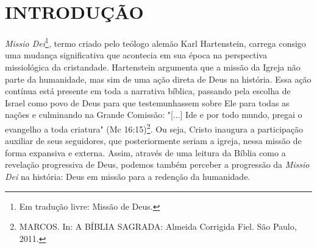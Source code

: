 \documentclass[
    article,            %
	12pt,				%
	oneside,			%
	a4paper,			%
	chapter=TITLE,		%
	section=TITLE,		%
	english,			%
	french,				%
	spanish,			%
	brazil				%
	]{abntex2}
\begin{document}



\imprimircapa

\imprimirfolhaderosto

\tableofcontents*
\cleardoublepage

\textual
\pagestyle{simple}



\section{INTRODUÇÃO}
\emph{Missio Dei}\footnote{Em tradução livre: Missão de Deus.}, termo criado pelo teólogo alemão Karl Hartenstein, carrega consigo uma mudança significativa que acontecia em sua época na perspectiva missiológica da cristandade. Hartenstein argumenta que a missão da Igreja não parte da humanidade, mas sim de uma ação direta de Deus na história. Essa ação contínua está presente em toda a narrativa bíblica, passando pela escolha de Israel como povo de Deus para que testemunhassem sobre Ele para todas as nações e culminando na Grande Comissão: "[...] Ide e por todo mundo, pregai o evangelho a toda criatura" (Mc 16:15)\footnote{MARCOS. In: A BÍBLIA SAGRADA: Almeida Corrigida Fiel. São Paulo, 2011.}. Ou seja, Cristo inaugura a participação auxiliar de seus seguidores, que posteriormente seriam a igreja, nessa missão de forma expansiva e externa. Assim, através de uma leitura da Bíblia como a revelação progressiva de Deus, podemos também perceber a progressão da \emph{Missio Dei} na história: Deus em missão para a redenção da humanidade.
\end{document}

